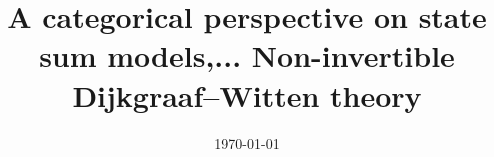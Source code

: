 \documentclass{amsart}
\title{A categorical perspective on state sum models,... Non-invertible Dijkgraaf--Witten theory}
\date{\today}
\begin{document}
	
	\maketitle
	
	
 
    
    
	
	\sloppy
	\printbibliography
\end{document}

